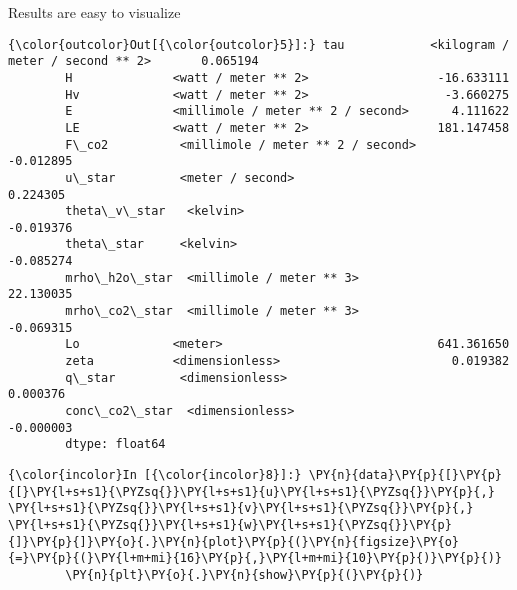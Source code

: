 \begin{exampleblock}{Results are easy to visualize}
\begin{Verbatim}[commandchars=\\\{\}]
{\color{outcolor}Out[{\color{outcolor}5}]:} tau            <kilogram / meter / second ** 2>       0.065194
        H              <watt / meter ** 2>                  -16.633111
        Hv             <watt / meter ** 2>                   -3.660275
        E              <millimole / meter ** 2 / second>      4.111622
        LE             <watt / meter ** 2>                  181.147458
        F\_co2          <millimole / meter ** 2 / second>     -0.012895
        u\_star         <meter / second>                       0.224305
        theta\_v\_star   <kelvin>                              -0.019376
        theta\_star     <kelvin>                              -0.085274
        mrho\_h2o\_star  <millimole / meter ** 3>              22.130035
        mrho\_co2\_star  <millimole / meter ** 3>              -0.069315
        Lo             <meter>                              641.361650
        zeta           <dimensionless>                        0.019382
        q\_star         <dimensionless>                        0.000376
        conc\_co2\_star  <dimensionless>                       -0.000003
        dtype: float64
\end{Verbatim}
            
    \begin{Verbatim}[commandchars=\\\{\}]
{\color{incolor}In [{\color{incolor}8}]:} \PY{n}{data}\PY{p}{[}\PY{p}{[}\PY{l+s+s1}{\PYZsq{}}\PY{l+s+s1}{u}\PY{l+s+s1}{\PYZsq{}}\PY{p}{,} \PY{l+s+s1}{\PYZsq{}}\PY{l+s+s1}{v}\PY{l+s+s1}{\PYZsq{}}\PY{p}{,} \PY{l+s+s1}{\PYZsq{}}\PY{l+s+s1}{w}\PY{l+s+s1}{\PYZsq{}}\PY{p}{]}\PY{p}{]}\PY{o}{.}\PY{n}{plot}\PY{p}{(}\PY{n}{figsize}\PY{o}{=}\PY{p}{(}\PY{l+m+mi}{16}\PY{p}{,}\PY{l+m+mi}{10}\PY{p}{)}\PY{p}{)}
        \PY{n}{plt}\PY{o}{.}\PY{n}{show}\PY{p}{(}\PY{p}{)}
\end{Verbatim}


    \begin{center}
    \end{center}
    { \hspace*{\fill} \\}
    \end{exampleblock}


